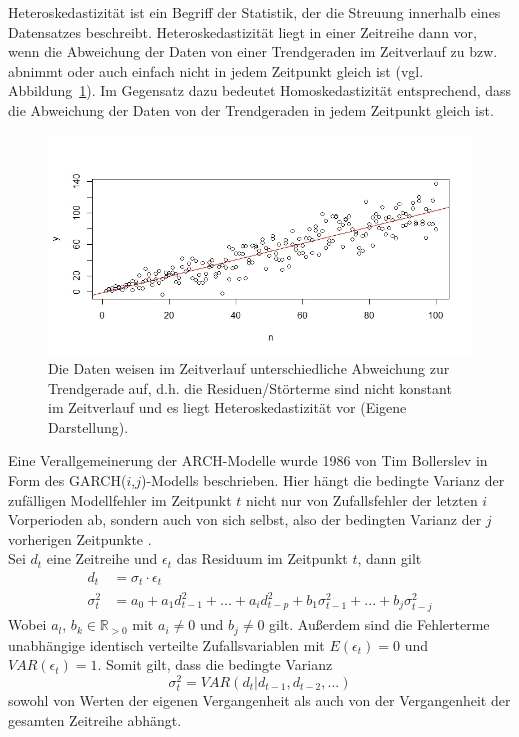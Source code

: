 \documentclass[ngerman]{ttlab-qualify}
\begin{document}
Heteroskedastizität ist ein Begriff der Statistik, der die Streuung innerhalb eines Datensatzes beschreibt. Heteroskedastizität liegt in einer Zeitreihe dann vor, wenn die Abweichung der Daten von einer Trendgeraden im Zeitverlauf zu bzw. abnimmt oder auch einfach nicht in jedem Zeitpunkt gleich ist (vgl. Abbildung~\ref{fig:heteroscedasticity}). Im Gegensatz dazu bedeutet Homoskedastizität entsprechend, dass die Abweichung der Daten von der Trendgeraden in jedem Zeitpunkt gleich ist.

\begin{figure}[h]
\begin{center}
\includegraphics[scale=.6]{images/heteroscedasticity-own-ref}
\caption{Die Daten weisen im Zeitverlauf unterschiedliche Abweichung zur Trendgerade auf, d.h. die Residuen/Störterme sind nicht konstant im Zeitverlauf und es liegt Heteroskedastizität vor (Eigene Darstellung).}
\label{fig:heteroscedasticity}
\end{center}
\end{figure}

Eine Verallgemeinerung der ARCH-Modelle wurde 1986 von Tim Bollerslev in Form des GARCH($i$,$j$)-Modells beschrieben. Hier hängt die bedingte Varianz der zufälligen Modellfehler im Zeitpunkt $t$ nicht nur von Zufallsfehler der letzten $i$ Vorperioden ab, sondern auch von sich selbst, also der bedingten Varianz der $j$ vorherigen Zeitpunkte \parencite{bollerslev:1986}.\\
Sei $d_t$ eine Zeitreihe und $\epsilon_t$ das Residuum im Zeitpunkt $t$, dann gilt
\begin{align}
d_t&= \sigma_t\cdot \epsilon_t \nonumber \\
\sigma_t^2 &= a_0 + a_1d_{t-1}^2 + ... + a_id_{t-p}^2+b_1\sigma_{t-1}^2+ ... +b_j\sigma_{t-j}^2
\end{align} 
Wobei $a_l$, $b_k \in \mathbb{R}_{>0}$ mit  $a_i \neq 0$ und $b_j\neq 0$ gilt. Außerdem sind die Fehlerterme unabhängige identisch verteilte Zufallsvariablen mit $E(\epsilon_t)=0$ und $VAR(\epsilon_t)=1$. 
Somit gilt, dass die bedingte Varianz 
\[\sigma_t^2 = VAR(d_t|d_{t-1},d_{t-2},...)\]
sowohl von Werten der eigenen Vergangenheit als auch von der Vergangenheit der gesamten Zeitreihe abhängt.
\end{document}
